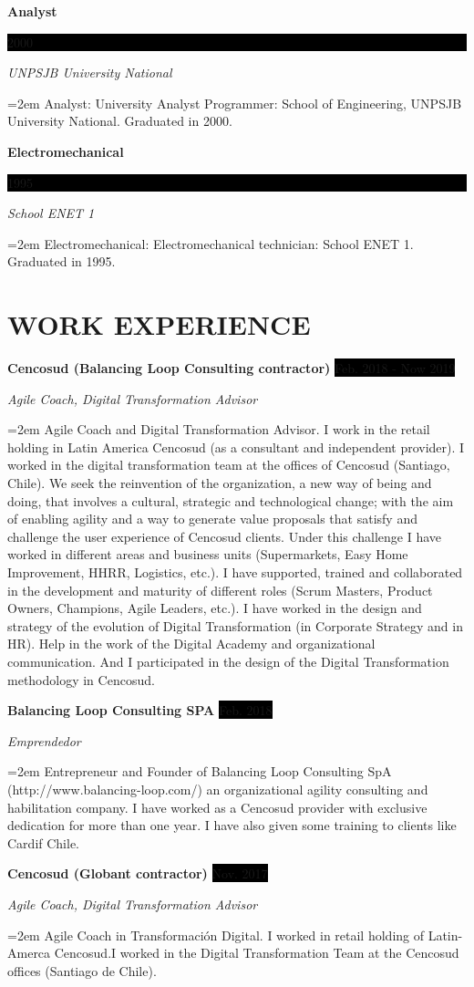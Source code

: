 \documentclass[paper=a4,fontsize=11pt]{scrartcl} %
\newcommand{\sepspace}{\vspace*{1em}}		%
\newcommand{\NewPart}[1]{\section*{\uppercase{#1}}}
\newcommand{\EducationEntry}[4]{ %
		\noindent \textbf{#1} \hfill      %
		\colorbox{Black}{%
			\parbox{6em}{%
			\hfill\color{White}#2}} \par  %
		\noindent \textit{#3} \par        %
		\noindent\hangindent=2em\hangafter=0 \small #4 %
		\normalsize \par}
\newcommand{\WorkEntry}[4]{				  %
		\noindent \textbf{#1} \hfill      %
		\colorbox{Black}{\color{White}#2} \par  %
		\noindent \textit{#3} \par              %
		\noindent\hangindent=2em\hangafter=0 \small #4 %
		\normalsize \par}
\begin{document}
\EducationEntry{Analyst}{2000}{UNPSJB University National}{Analyst: University Analyst Programmer: School of Engineering, UNPSJB University National. Graduated in 2000.}
\sepspace

\EducationEntry{Electromechanical}{1995}{School ENET 1}{Electromechanical: Electromechanical technician: School ENET 1. Graduated in 1995.}
\sepspace

\NewPart{Work experience}{}

\WorkEntry{Cencosud (Balancing Loop Consulting contractor)}{Feb. 2018 - Now 2019}{Agile Coach, Digital Transformation Advisor}{
Agile Coach and Digital Transformation Advisor. I work in the retail holding in Latin America Cencosud (as a consultant and independent provider). I worked in the digital transformation team at the offices of Cencosud (Santiago, Chile). We seek the reinvention of the organization, a new way of being and doing, that involves a cultural, strategic and technological change; with the aim of enabling agility and a way to generate value proposals that satisfy and challenge the user experience of Cencosud clients. Under this challenge I have worked in different areas and business units (Supermarkets, Easy Home Improvement, HHRR, Logistics, etc.). I have supported, trained and collaborated in the development and maturity of different roles (Scrum Masters, Product Owners, Champions, Agile Leaders, etc.). I have worked in the design and strategy of the evolution of Digital Transformation (in Corporate Strategy and in HR). Help in the work of the Digital Academy and organizational communication. And I participated in the design of the Digital Transformation methodology in Cencosud.
}

\WorkEntry{Balancing Loop Consulting SPA}{Feb. 2018}{Emprendedor}{
Entrepreneur and Founder of Balancing Loop Consulting SpA (http://www.balancing-loop.com/) an organizational agility consulting and habilitation company. I have worked as a Cencosud provider with exclusive dedication for more than one year. I have also given some training to clients like Cardif Chile.
}

\WorkEntry{Cencosud (Globant contractor)}{Nov. 2017}{Agile Coach, Digital Transformation Advisor}{
Agile Coach in Transformación Digital. I worked in retail holding of Latin-Amerca Cencosud.I worked in the Digital Transformation Team at the Cencosud offices (Santiago de Chile).
}
\end{document}
